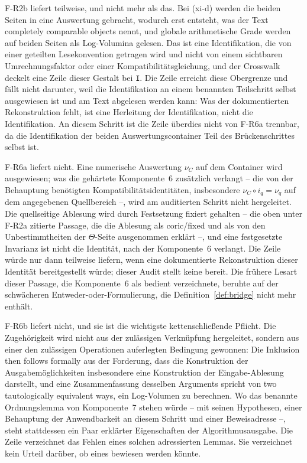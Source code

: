 \documentclass[11pt,a4paper]{article}
\begin{document}
F-R2b liefert teilweise, und nicht mehr als das. Bei (xi-d) werden die
beiden Seiten in eine Auswertung gebracht, wodurch erst entsteht, was der
Text \glqq completely comparable objects\grqq{} nennt, und globale arithmetische Grade
werden auf beiden Seiten als Log-Volumina gelesen. Das ist eine
Identifikation, die von einer geteilten Lesekonvention getragen wird und
nicht von einem sichtbaren Umrechnungsfaktor oder einer
Kompatibilitätsgleichung, und der Crosswalk deckelt eine Zeile dieser Gestalt
bei \texttt{I}. Die Zeile erreicht diese Obergrenze und fällt nicht darunter,
weil die Identifikation an einem benannten Teilschritt selbst ausgewiesen ist
und am Text abgelesen werden kann: Was der dokumentierten Rekonstruktion
fehlt, ist eine Herleitung der Identifikation, nicht die Identifikation. An
diesem Schritt ist die Zeile überdies nicht von F-R6a trennbar, da die
Identifikation der beiden Auswertungscontainer Teil des Brückenschrittes
selbst ist.

F-R6a liefert nicht. Eine numerische Auswertung $\nu_C$ auf dem Container
wird ausgewiesen; was die gehärtete Komponente~6 zusätzlich verlangt -- die
von der Behauptung benötigten Kompatibilitätsidentitäten, insbesondere
$\nu_C \circ i_q = \nu_q$ auf dem angegebenen Quellbereich --, wird am
auditierten Schritt nicht hergeleitet. Die quellseitige Ablesung wird durch
Festsetzung fixiert gehalten -- die oben unter F-R2a zitierte Passage, die
die Ablesung als \glqq coric\grqq{}/\glqq fixed\grqq{} und als von den Unbestimmtheiten der
$\Theta$-Seite ausgenommen erklärt --, und eine festgesetzte Invarianz ist
nicht die Identität, nach der Komponente~6 verlangt. Die Zeile würde nur dann
teilweise liefern, wenn eine dokumentierte Rekonstruktion dieser Identität
bereitgestellt würde; dieser Audit stellt keine bereit. Die frühere Lesart
dieser Passage, die Komponente~6 als bedient verzeichnete, beruhte auf der
schwächeren Entweder-oder-Formulierung, die Definition~\ref{def:bridge} nicht
mehr enthält.

F-R6b liefert nicht, und sie ist die wichtigste kettenschließende Pflicht.
Die Zugehörigkeit wird nicht aus der zulässigen Verknüpfung hergeleitet,
sondern aus einer den zulässigen Operationen auferlegten Bedingung gewonnen:
Die Inklusion \glqq then follows formally\grqq{} aus der Forderung, dass die
Konstruktion der Ausgabemöglichkeiten insbesondere eine Konstruktion der
Eingabe-Ablesung darstellt, und eine Zusammenfassung desselben Arguments
spricht von \glqq two tautologically equivalent ways\grqq{}, ein Log-Volumen zu
berechnen. Wo das benannte Ordnungslemma von Komponente~7 stehen würde -- mit
seinen Hypothesen, einer Behauptung der Anwendbarkeit an diesem Schritt und
einer Beweisadresse --, steht stattdessen ein Paar erklärter Eigenschaften
der Algorithmusausgabe. Die Zeile verzeichnet das Fehlen eines solchen
adressierten Lemmas. Sie verzeichnet kein Urteil darüber, ob eines bewiesen
werden könnte.
\end{document}
